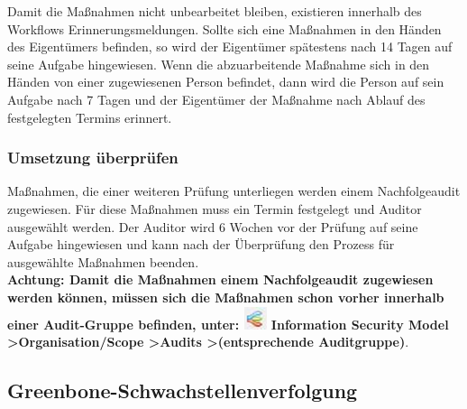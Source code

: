 \documentclass[a4paper,10pt]{book}
\begin{document}
Damit die Maßnahmen nicht unbearbeitet bleiben, existieren innerhalb des Workflows Erinnerungsmeldungen. Sollte sich eine Maßnahmen in den Händen des
Eigentümers befinden, so wird der Eigentümer spätestens nach 14 Tagen auf seine Aufgabe hingewiesen. Wenn die abzuarbeitende Maßnahme sich in den Händen von
einer zugewiesenen Person befindet, dann wird die Person auf sein Aufgabe nach 7 Tagen und der Eigentümer der Maßnahme nach Ablauf des festgelegten Termins
erinnert.

\subsubsection{Umsetzung überprüfen}
Maßnahmen, die einer weiteren Prüfung unterliegen werden einem Nachfolgeaudit zugewiesen. Für diese Maßnahmen muss ein Termin festgelegt und Auditor ausgewählt
werden. Der Auditor wird 6 Wochen vor der Prüfung auf seine Aufgabe hingewiesen und kann nach der Überprüfung den Prozess für ausgewählte Maßnahmen beenden.
\newline\\
\textbf{Achtung: Damit die Maßnahmen einem Nachfolgeaudit zugewiesen werden können, müssen sich die Maßnahmen schon vorher innerhalb einer Audit-Gruppe befinden,
unter: \textbf {\includegraphics[height=2ex]{Icon/Informationssicherheitsmodell.png} Information Security Model \textgreater Organisation/Scope \textgreater Audits
\textgreater (entsprechende Auditgruppe)}}.

\subsection{Greenbone-Schwachstellenverfolgung}
\label{sec:workflow:greenbone-schwachstellenverfolgung}
\end{document}
